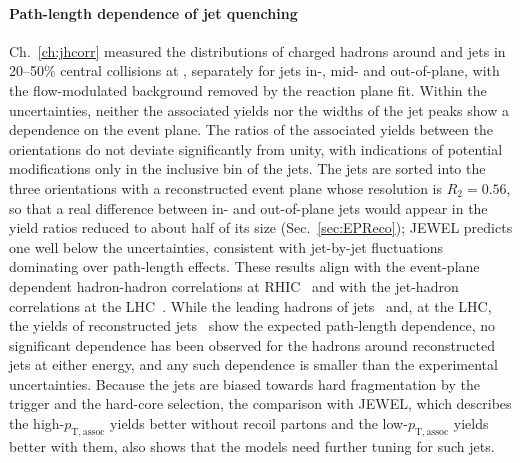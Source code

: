 \paragraph{Path-length dependence of jet quenching}
Ch.~\ref{ch:jhcorr} measured the distributions of charged hadrons around  and  jets in 20--50\% central \AuAu collisions at , separately for jets in-, mid- and out-of-plane, with the flow-modulated background removed by the reaction plane fit.
%
Within the uncertainties, neither the associated yields nor the widths of the jet peaks show a dependence on the event plane.
%
The ratios of the associated yields between the orientations do not deviate significantly from unity, with indications of potential modifications only in the inclusive  bin of the  jets.
%
The jets are sorted into the three orientations with a reconstructed event plane whose resolution is \(R_2 = 0.56\), so that a real difference between in- and out-of-plane jets would appear in the yield ratios reduced to about half of its size (Sec.~\ref{sec:EPReco}); JEWEL predicts one well below the uncertainties, consistent with jet-by-jet fluctuations dominating over path-length effects.
%
These results align with the event-plane dependent hadron-hadron correlations at RHIC~\cite{Nattrass:2016cln} and with the jet-hadron correlations at the LHC~\cite{PhysRevC.101.064901}.
%
While the leading hadrons of jets~\cite{PhysRevC.76.034904} and, at the LHC, the yields of reconstructed jets~\cite{ALICE:2023dei} show the expected path-length dependence, no significant dependence has been observed for the hadrons around reconstructed jets at either energy, and any such dependence is smaller than the experimental uncertainties.
%
Because the jets are biased towards hard fragmentation by the trigger and the hard-core selection, the comparison with JEWEL, which describes the high-\(p_\mathrm{T, assoc}\) yields better without recoil partons and the low-\(p_\mathrm{T, assoc}\) yields better with them, also shows that the models need further tuning for such jets.

